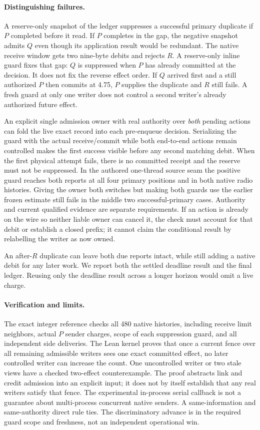 \documentclass{article}
\begin{document}
\paragraph{Distinguishing failures.}
A reserve-only snapshot of the ledger suppresses a successful
primary duplicate if $P$ completed before it read. If $P$
completes in the gap, the negative snapshot admits $Q$ even
though its application result would be redundant. The native
receive window gets two nine-byte debits and rejects $R$.
A reserve-only inline guard fixes that gap: $Q$ is suppressed
when $P$ has already committed at the decision. It does not fix
the reverse effect order. If $Q$ arrived first and a still
authorized $P$ then commits at 4.75, $P$ supplies the duplicate
and $R$ still fails. A fresh guard at only one writer does not
control a second writer's already authorized future effect.

An explicit single admission owner with real authority over
\emph{both} pending actions can fold the live exact record into
each pre-enqueue decision. Serializing the guard with the actual
receive/commit while both end-to-end actions remain controlled
makes the first success visible before any second matching
debit. When the first physical attempt fails, there is no
committed receipt and the reserve must not be suppressed. In
the authored one-thread source seam the positive guard reaches
both reports at all four primary positions and in both native
radio histories. Giving the owner both switches but making
both guards use the earlier frozen estimate still fails in
the middle two successful-primary cases. Authority and current
qualified evidence are separate requirements. If an action is
already on the wire so neither liable owner can cancel it,
the check must account for that debit or establish a closed
prefix; it cannot claim the conditional result by relabelling
the writer as now owned.

An after-$R$ duplicate can leave both due reports intact, while
still adding a native debit for any later work. We report both
the settled deadline result and the final ledger. Reusing only
the deadline result across a longer horizon would omit a live
charge.

\paragraph{Verification and limits.}
The exact integer reference checks all 480 native histories,
including receive limit neighbors, actual $P$ sender charges,
scope of each suppression guard, and all independent side
deliveries. The Lean kernel proves that once a current fence
over all remaining admissible writers sees one exact committed
effect, no later controlled writer can increase the count. One
uncontrolled writer or two stale views have a checked two-effect
counterexample. The proof abstracts link and credit admission
into an explicit input; it does not by itself establish that
any real writers satisfy that fence. The experimental in-process
serial callback is not a guarantee about multi-process concurrent
native senders. A same-information and same-authority direct
rule ties. The discriminatory advance is in the required
guard scope and freshness, not an independent operational win.
\end{document}

